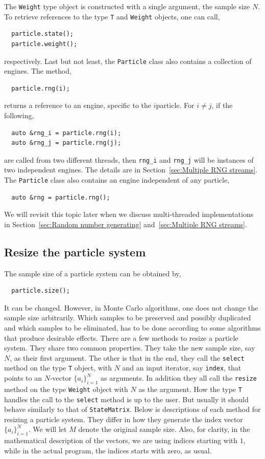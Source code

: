 The \verb|Weight| type object is constructed with a single argument, the sample
size $N$. To retrieve references to the type \verb|T| and \verb|Weight|
objects, one can call,
\begin{Verbatim}
  particle.state();
  particle.weight();
\end{Verbatim}
respectively. Last but not least, the \verb|Particle| class also contains a
collection of \rng engines. The method,
\begin{Verbatim}
  particle.rng(i);
\end{Verbatim}
returns a reference to an \rng engine, specific to the $i$\ith particle. For $i
\ne j$, if the following,
\begin{Verbatim}
  auto &rng_i = particle.rng(i);
  auto &rng_j = particle.rng(j);
\end{Verbatim}
are called from two different threads, then \verb|rng_i| and \verb|rng_j| will
be instances of two independent \rng engines. The details are in
Section~\ref{sec:Multiple RNG streams}. The \verb|Particle| class also contains
an \rng engine independent of any particle,
\begin{Verbatim}
  auto &rng = particle.rng();
\end{Verbatim}
We will revisit this topic later when we discuss multi-threaded implementations
in Section~\ref{sec:Random number generating} and~\ref{sec:Multiple RNG
  streams}.

\subsection{Resize the particle system}
\label{sub:Resize the particle system}

The sample size of a particle system can be obtained by,
\begin{Verbatim}
  particle.size();
\end{Verbatim}
It can be changed. However, in Monte Carlo algorithms, one does not change the
sample size arbitrarily. Which samples to be preserved and possibly duplicated
and which samples to be eliminated, has to be done according to some algorithms
that produce desirable effects. There are a few methods to resize a particle
system. They share two common properties. They take the new sample size, say
$N$, as their first argument. The other is that in the end, they call the
\verb|select| method on the type \verb|T| object, with $N$ and an input
iterator, say \verb|index|, that points to an $N$-vector $\{a_i\}_{i=1}^N$ as
arguments. In addition they all call the \verb|resize| method on the type
\verb|Weight| object with $N$ as the argument. How the type \verb|T| handles
the call to the \verb|select| method is up to the user. But usually it should
behave similarly to that of \verb|StateMatrix|. Below is descriptions of each
method for resizing a particle system. They differ in how they generate the
index vector $\{a_i\}_{i=1}^N$. We will let $M$ denote the original sample
size. Also, for clarity, in the mathematical description of the vectors, we are
using indices starting with $1$, while in the actual \cpp program, the indices
starts with zero, as usual.

